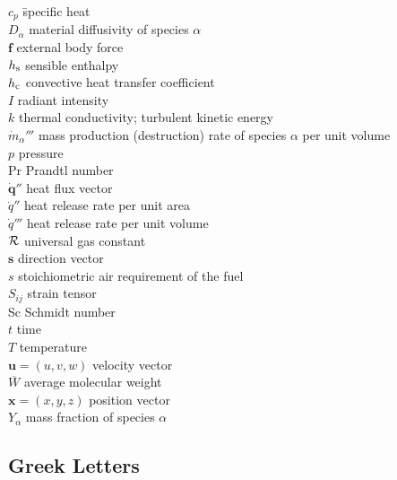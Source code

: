 \documentclass[graybox]{svmult}
\begin{document}
\begin{tabbing}
$c_p$ 	\hspace{1in}     \= specific heat \\
$D_\alpha$	             \> material diffusivity of species $\alpha$ \\
$\mathbf{f}$	         \> external body force \\
$h_{\rm s}$              \>	sensible enthalpy \\
$h_{\rm c}$ 	         \> convective heat transfer coefficient \\
$I$	                     \> radiant intensity \\
$k$	                     \> thermal	conductivity; turbulent	kinetic energy \\
$\dot{m}_\alpha'''$      \> mass production (destruction) rate of species $\alpha$ per unit volume \\
$p$	                     \> pressure \\
Pr	                     \> Prandtl number \\
$\dot{\mathbf{q}}''$	 \> heat flux vector \\
$\dot{q}''$              \> heat release rate per unit area \\
$\dot{q}'''$             \> heat release rate per unit volume \\
$\cal R$                 \> universal gas constant \\
$\mathbf{s}$	         \> direction vector \\
$s$	                     \> stoichiometric air requirement of the fuel \\
$S_{ij}$ 	             \> strain tensor \\
Sc	                     \> Schmidt number \\
$t$	                     \> time \\
$T$	                     \> temperature \\
$\mathbf{u}=(u,v,w)$     \> velocity vector \\
$\overline{W}$	         \> average molecular weight \\
$\mathbf{x}=(x,y,z)$	 \> position vector \\
$Y_\alpha$               \> mass fraction of species $\alpha$
\end{tabbing}

\subsection{Greek Letters}
\end{document}
